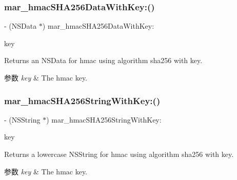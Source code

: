 \subsubsection{\texorpdfstring{mar\+\_\+hmac\+S\+H\+A256\+Data\+With\+Key\+:()}{mar\_hmacSHA256DataWithKey:()}}
{\footnotesize\ttfamily -\/ (N\+S\+Data $\ast$) mar\+\_\+hmac\+S\+H\+A256\+Data\+With\+Key\+: \begin{DoxyParamCaption}\item[{(N\+S\+Data $\ast$)}]{key }\end{DoxyParamCaption}}

Returns an N\+S\+Data for hmac using algorithm sha256 with key. 
\begin{DoxyParams}{参数}
{\em key} & The hmac key. \\
\hline
\end{DoxyParams}
\mbox{\label{category_n_s_data_07_m_a_r_e_x_08_a9bf4c0687c230f5a3151cf9b919b3659}} 
\subsubsection{\texorpdfstring{mar\+\_\+hmac\+S\+H\+A256\+String\+With\+Key\+:()}{mar\_hmacSHA256StringWithKey:()}}
{\footnotesize\ttfamily -\/ (N\+S\+String $\ast$) mar\+\_\+hmac\+S\+H\+A256\+String\+With\+Key\+: \begin{DoxyParamCaption}\item[{(N\+S\+String $\ast$)}]{key }\end{DoxyParamCaption}}

Returns a lowercase N\+S\+String for hmac using algorithm sha256 with key. 
\begin{DoxyParams}{参数}
{\em key} & The hmac key. \\
\hline
\end{DoxyParams}
\mbox{\label{category_n_s_data_07_m_a_r_e_x_08_ab43e4097394901dc7b3e9559758c8463}} 
